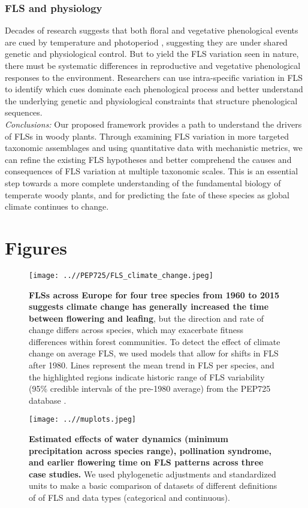 \documentclass{article}
\begin{document}
\subsubsection*{FLS and physiology} 
Decades of research suggests that both floral and vegetative phenological events are cued by temperature and photoperiod \citep{Forrest2010, Flynn2018}, suggesting they are under shared genetic and physiological control. But to yield the FLS variation seen in nature, there must be systematic differences in reproductive and vegetative phenological responses to the environment. Researchers can use intra-specific variation in FLS to identify which cues dominate each phenological process and better understand the underlying genetic and physiological constraints that structure phenological sequences.\\

\emph{Conclusions:} Our proposed framework provides a path to understand the drivers of FLSs in woody plants. Through examining FLS variation in more targeted taxonomic assemblages and using quantitative data with mechanistic metrics, we can refine the existing FLS hypotheses and better comprehend the causes and consequences of FLS variation at multiple taxonomic scales. This is an essential step towards a more complete understanding of the fundamental biology of temperate woody plants, and for predicting the fate of these species as global climate continues to change.


\section*{Figures}
\begin{figure}[ht]
    \centering
 \texttt{[image: ..//PEP725/FLS\_climate\_change.jpeg]} 
    \caption{\textbf{FLSs across Europe for four tree species from 1960 to 2015 suggests climate change has generally increased the time between flowering and leafing}, but the direction and rate of change differs across species, which may exacerbate fitness differences within forest communities. To detect the effect of climate change on average FLS, we used models that allow for shifts in FLS after 1980. Lines represent the mean trend in FLS per species, and the highlighted regions indicate historic range of FLS variability (95\% credible intervals of the pre-1980 average) from the PEP725 database \citep{PEP725}.}
    \label{fig:climchange}
\end{figure}

  \begin{figure}[ht]
    \centering
    \texttt{[image: ..//muplots.jpeg]}
    \caption{\textbf{Estimated effects of water dynamics (minimum precipitation across species range), pollination syndrome, and earlier flowering time on FLS patterns across three case studies.} We used phylogenetic adjustments and standardized units to make a basic comparison of datasets of different  definitions of of FLS and  data types (categorical and continuous).  }
  \label{fig:muplots}
    \end{figure}
\end{document}
